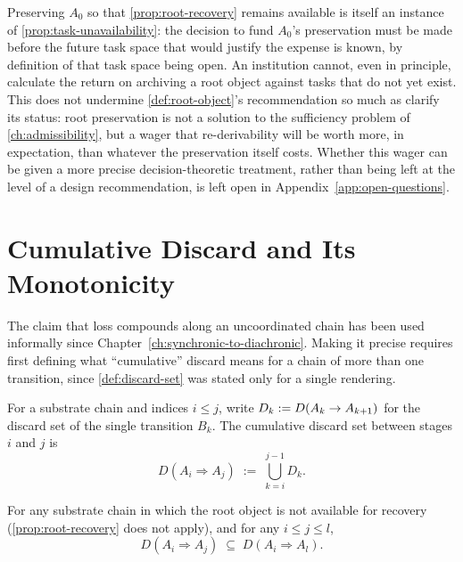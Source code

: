 \begin{remark}
\label{rem:root-bootstrap}
Preserving $A_0$ so that \cref{prop:root-recovery} remains available is
itself an instance of \cref{prop:task-unavailability}: the decision to fund
$A_0$'s preservation must be made before the future task space that would
justify the expense is known, by definition of that task space being open.
An institution cannot, even in principle, calculate the return on
archiving a root object against tasks that do not yet exist. This does not
undermine \cref{def:root-object}'s recommendation so much as clarify its
status: root preservation is not a solution to the sufficiency problem of
\cref{ch:admissibility}, but a wager that re-derivability will be worth
more, in expectation, than whatever the preservation itself costs. Whether
this wager can be given a more precise decision-theoretic treatment,
rather than being left at the level of a design recommendation, is left
open in Appendix~\ref{app:open-questions}.
\end{remark}

\section{Cumulative Discard and Its Monotonicity}

The claim that loss compounds along an uncoordinated chain has been used
informally since Chapter~\ref{ch:synchronic-to-diachronic}. Making it
precise requires first defining what ``cumulative'' discard means for a
chain of more than one transition, since \cref{def:discard-set} was stated
only for a single rendering.

\begin{definition}
\label{def:cumulative-discard}
For a substrate chain and indices $i \le j$, write $D_k := D(A_k
\to A_{k+1})$ for the discard set of the single transition $B_k$. The
cumulative discard set between stages $i$ and $j$ is
\[
D(A_i \Rightarrow A_j) \;:=\; \bigcup_{k=i}^{j-1} D_k.
\]
\end{definition}

\begin{proposition}
\label{prop:monotonicity}
For any substrate chain in which the root object is not available for
recovery (\cref{prop:root-recovery} does not apply), and for any $i \le j
\le l$,
\[
D(A_i \Rightarrow A_j) \;\subseteq\; D(A_i \Rightarrow A_l).
\]
\end{proposition}

